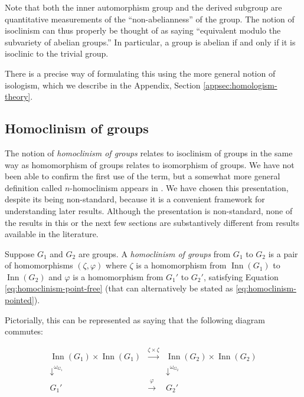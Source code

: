 \documentclass{ucetd}
\begin{document}
Note that both the inner automorphism group and the derived subgroup
are quantitative measurements of the ``non-abelianness'' of the
group. The notion of isoclinism can thus properly be thought of as
saying ``equivalent modulo the subvariety of abelian groups.'' In
particular, a group is abelian if and only if it is isoclinic to the
trivial group.

There is a precise way of formulating this using the more general
notion of isologism, which we describe in the Appendix, Section
\ref{appsec:homologism-theory}.

\subsection{Homoclinism of groups}\label{sec:homoclinism-definition}

The notion of {\em homoclinism of groups} relates to isoclinism of
groups in the same way as homomorphism of groups relates to
isomorphism of groups. We have not been able to confirm the first use
of the term, but a somewhat more general definition called
$n$-homoclinism appears in \cite{Hekster}. We have chosen this
presentation, despite its being non-standard, because it is a
convenient framework for understanding later results. Although the
presentation is non-standard, none of the results in this or the next
few sections are substantively different from results available in the
literature.
 
Suppose $G_1$ and $G_2$ are groups. A {\em homoclinism of groups} from
$G_1$ to $G_2$ is a pair of homomorphisms $(\zeta,\varphi)$ where
$\zeta$ is a homomorphism from $\operatorname{Inn}(G_1)$ to
$\operatorname{Inn}(G_2)$ and $\varphi$ is a homomorphism from $G_1'$
to $G_2'$, satisfying Equation \ref{eq:homoclinism-point-free} (that
can alternatively be stated as \ref{eq:homoclinism-pointed}).

Pictorially, this can be represented as saying that the following
diagram commutes:

$$\begin{array}{ccc}
  \operatorname{Inn}(G_1) \times \operatorname{Inn}(G_1) & \stackrel{\zeta \times \zeta}{\to} & \operatorname{Inn}(G_2) \times \operatorname{Inn}(G_2) \\
  \downarrow^{\omega_{G_1}}  & & \downarrow^{\omega_{G_2}}\\
  G_1' & \stackrel{\varphi}{\to} & G_2'\\
\end{array}$$
\end{document}
